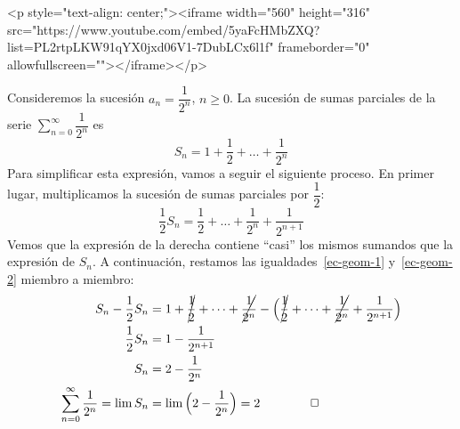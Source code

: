 \begin{rawhtml}
<p style="text-align: center;"><iframe width="560" height="316" src="https://www.youtube.com/embed/5yaFcHMbZXQ?list=PL2rtpLKW91qYX0jxd06V1-7DubLCx6l1f" frameborder="0" allowfullscreen=""></iframe></p>
\end{rawhtml}
\begin{ejemplo}\label{ej:geom12}
Consideremos la sucesión $a_n=\dfrac1{2^n}$, $n\ge 0$.
La sucesión de sumas parciales de la serie $\displaystyle\sum_{n=0}^\infty  \dfrac1{2^n}$ es
\begin{equation}\label{ec-geom-1}
S_n=1+\frac12+\dots+\frac1{2^n}
\end{equation}
Para simplificar esta expresión, vamos a seguir el siguiente proceso.
En primer lugar, multiplicamos la sucesión de sumas parciales por $\dfrac12$:
\begin{equation}\label{ec-geom-2}
\dfrac12S_n=\frac12+\dots+\frac1{2^n}+\frac1{2^{n+1}}
\end{equation}
Vemos que la expresión de la derecha contiene ``casi'' los mismos sumandos que la expresión de $S_n$.
A continuación, restamos las igualdades~\eqref{ec-geom-1} y~\eqref{ec-geom-2} miembro a miembro:
\begin{align*}
S_n-\dfrac12S_n & =1+\cancel{\frac12}+\dots+\cancel{\frac1{2^n}} -\Big(\cancel{\frac12}+\dots+\cancel{\frac1{2^n}}+\frac1{2^{n+1}}\Big) \\
\dfrac12S_n&=1-\frac1{2^{n+1}}\\
S_n&=2-\frac1{2^{n}}\\
\displaystyle\sum_{n=0}^\infty  \dfrac1{2^n} = \lim S_n &=\lim \Big(2-\frac1{2^{n}}\Big)=2\tag*{\fej}
\end{align*}
%
\end{ejemplo}

